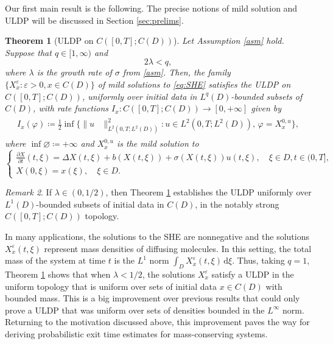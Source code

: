 \documentclass{amsart}
\theoremstyle{plain}
\newtheorem{theorem}{Theorem}[section]
\theoremstyle{remark}
\newtheorem{remark}[theorem]{Remark}
\theoremstyle{plain}
\numberwithin{equation}{section}
\newcommand{\ceqq}{\coloneqq}
\newcommand{\col}{\colon}
\newcommand{\eps}{\varepsilon}
\newcommand{\dd}{\,\mathrm{d}}
\begin{document}
Our first main result is the following. The precise notions of mild solution and ULDP will be discussed in Section \ref{sec:prelims}.  
 
\begin{theorem}[{ULDP on $C([0,T];C(D))$}]\label{th:C} Let Assumption \ref{asm} hold.  Suppose that $q\in[1,\infty)$ and  
\begin{equation*} 
2\lambda<q, 
\end{equation*}
where $\lambda$ is the growth rate of $\sigma$ from \eqref{asm}. 
Then, the family $\{X_x^{\eps}:\eps>0,x\in C(D)\}$ of mild solutions to \eqref{eq:SHE} satisfies the ULDP on $C([0,T];C(D))$, uniformly over initial data in $L^q(D)$-bounded subsets of $C(D)$, with rate functions $I_x\col C([0,T];C(D))\to [0,+\infty]$ given by 
\begin{align}\label{eq:rate}
\begin{split}
I_x(\varphi)\ceqq \frac12\inf\{\|u&\|_{L^2(0,T;L^2(D))}^2 :     u\in L^2(0,T;L^2(D)),\,\varphi=X_x^{0,u}\}, 
\end{split}
\end{align}
where $\inf\varnothing\ceqq +\infty$ and $X_x^{0,u}$ is the mild solution to 
\begin{equation*} 
\begin{cases}
\frac{\partial X}{\partial t}(t, \xi) = \Delta X(t, \xi) +b(X(t,\xi))+ \sigma(X(t, \xi))u(t,\xi), \quad  \xi \in D, t \in(0,T], \\ 
X(0, \xi) = x(\xi), \quad\xi\in D.
\end{cases} 
\end{equation*}  
\end{theorem}

\begin{remark}
If $\lambda\in(0,1/2)$, then  Theorem \ref{th:C} establishes the ULDP uniformly over $L^1(D)$-bounded subsets of initial data in $C(D)$, in the notably strong $C([0,T];C(D))$ topology. 
\end{remark} 

In many applications, the solutions to the SHE are nonnegative and the solutions $X^\eps_x(t,\xi)$ represent mass densities of diffusing molecules. In this setting, the total mass of the system at time $t$ is the $L^1$ norm $\int_D X^\eps_x(t,\xi)\dd \xi$. Thus, taking $q=1$, Theorem \ref{th:C}  shows that when $\lambda<1/2$, the solutions $X^\eps_x$ satisfy a ULDP in the uniform topology that is uniform over sets of initial data $x\in C(D)$ with bounded mass. This is a big improvement over previous results that could only prove a ULDP that was uniform over sets of densities bounded in the $L^\infty$ norm. Returning to the motivation discussed above, this improvement paves the way for deriving probabilistic exit time estimates for mass-conserving systems. 
\end{document}
